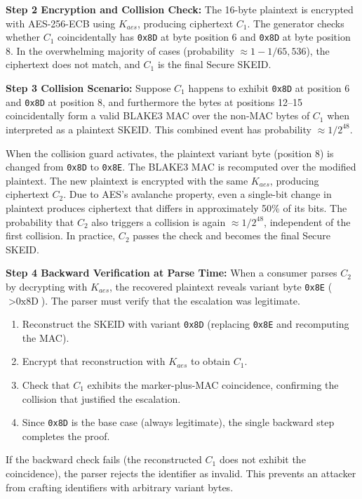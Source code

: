 \documentclass[fleqn,10pt,lineno]{wlpeerj}
\providecommand{\tightlist}{%
  \setlength{\itemsep}{0pt}\setlength{\parskip}{0pt}}
\begin{document}
\textbf{Step 2 Encryption and Collision Check:} The 16-byte plaintext is
encrypted with AES-256-ECB using \(K_{aes}\), producing ciphertext
\(C_1\). The generator checks whether \(C_1\) coincidentally has
\texttt{0x8D} at byte position 6 and \texttt{0x8D} at byte position 8.
In the overwhelming majority of cases (probability
\(\approx 1 - 1/65{,}536\)), the ciphertext does not match, and \(C_1\)
is the final Secure SKEID.

\textbf{Step 3 Collision Scenario:} Suppose \(C_1\) happens to exhibit
\texttt{0x8D} at position 6 and \texttt{0x8D} at position 8, and
furthermore the bytes at positions 12--15 coincidentally form a valid
BLAKE3 MAC over the non-MAC bytes of \(C_1\) when interpreted as a
plaintext SKEID. This combined event has probability
\(\approx 1/2^{48}\).

When the collision guard activates, the plaintext variant byte (position
8) is changed from \texttt{0x8D} to \texttt{0x8E}. The BLAKE3 MAC is
recomputed over the modified plaintext. The new plaintext is encrypted
with the same \(K_{aes}\), producing ciphertext \(C_2\). Due to AES's
avalanche property, even a single-bit change in plaintext produces
ciphertext that differs in approximately 50\% of its bits. The
probability that \(C_2\) also triggers a collision is again
\(\approx 1/2^{48}\), independent of the first collision. In practice,
\(C_2\) passes the check and becomes the final Secure SKEID.

\textbf{Step 4 Backward Verification at Parse Time:} When a consumer
parses \(C_2\) by decrypting with \(K_{aes}\), the recovered plaintext
reveals variant byte \texttt{0x8E} (\(> \text{0x8D}\)). The parser must
verify that the escalation was legitimate.

\begin{enumerate}
\def\labelenumi{\arabic{enumi}.}
\tightlist
\item
  Reconstruct the SKEID with variant \texttt{0x8D} (replacing
  \texttt{0x8E} and recomputing the MAC).
\item
  Encrypt that reconstruction with \(K_{aes}\) to obtain \(C_1\).
\item
  Check that \(C_1\) exhibits the marker-plus-MAC coincidence,
  confirming the collision that justified the escalation.
\item
  Since \texttt{0x8D} is the base case (always legitimate), the single
  backward step completes the proof.
\end{enumerate}

If the backward check fails (the reconstructed \(C_1\) does not exhibit
the coincidence), the parser rejects the identifier as invalid. This
prevents an attacker from crafting identifiers with arbitrary variant
bytes.
\end{document}
